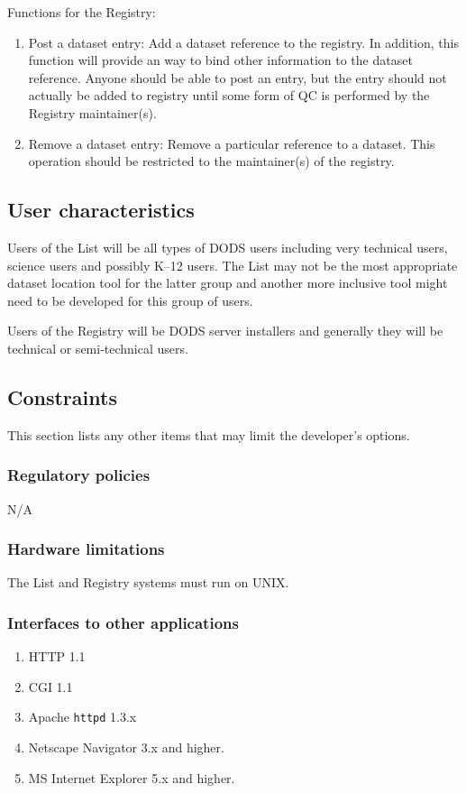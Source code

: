 \documentclass{article}
\begin{document}
Functions for the Registry:
\begin{enumerate}
\item Post a dataset entry: Add a dataset reference to the registry. In
  addition, this function will provide an way to bind other information to
  the dataset reference. Anyone should be able to post an entry, but the
  entry should not actually be added to registry until some form of QC is
  performed by the Registry maintainer(s).

\item Remove a dataset entry: Remove a particular reference to a dataset. This
  operation should be restricted to the maintainer(s) of the registry.
\end{enumerate}

\subsection{User characteristics}
Users of the List will be all types of \acs{DODS} users including very
technical users, science users and possibly K--12 users. The List may not be
the most appropriate dataset location tool for the latter group and another
more inclusive tool might need to be developed for this group of users.

Users of the Registry will be \acs{DODS} server installers and generally they
will be technical or semi-technical users.

\subsection{Constraints}
This section lists any other items that may limit the developer's options.

\subsubsection{Regulatory policies}
N/A

\subsubsection{Hardware limitations}
The List and Registry systems must run on UNIX.

\subsubsection{Interfaces to other applications}
\begin{enumerate}
\item HTTP 1.1
\item \acs{CGI} 1.1
\item Apache {\tt httpd} 1.3.x
\item Netscape Navigator 3.x and higher.
\item MS Internet Explorer 5.x and higher.
\end{enumerate}
\end{document}
